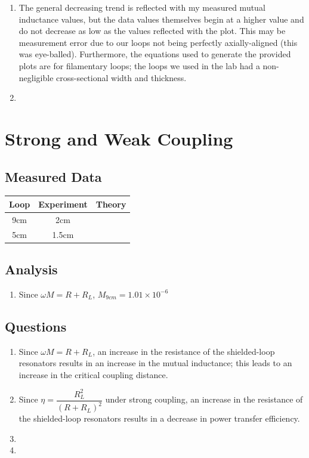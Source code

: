 \documentclass{article}
\begin{document}
\begin{enumerate}
	\item The general decreasing trend is reflected with my measured mutual inductance values, but the data values themselves begin at a higher value and do not decrease as low as the values reflected with the plot. This may be measurement error due to our loops not being perfectly axially-aligned (this was eye-balled). Furthermore, the equations used to generate the provided plots are for filamentary loops; the loops we used in the lab had a non-negligible cross-sectional width and thickness.

	\item
\end{enumerate}


\section{Strong and Weak Coupling}

\subsection{Measured Data}
\begin{table}[H]
\centering
\begin{tabular}{|c|c|c|}
\hline
Loop & Experiment & Theory \\ \hline
9cm & 2cm & \\ \hline
5cm & 1.5cm & \\ \hline
\end{tabular}
\end{table}

\subsection{Analysis}

\begin{enumerate}
	\item Since $\omega M = R + R_L$, $M_{9cm} = 1.01\times10^{-6}$
\end{enumerate}

\subsection{Questions}

\begin{enumerate}
	\item Since $\omega M = R + R_L$, an increase in the resistance of the shielded-loop resonators results in an increase in the mutual inductance; this leads to an increase in the critical coupling distance.
	\item Since $\eta = \dfrac{R_L^2}{(R+R_L)^2}$ under strong coupling, an increase in the resistance of the shielded-loop resonators results in a decrease in power transfer efficiency.
	\item 
	\item
\end{enumerate}
\end{document}
